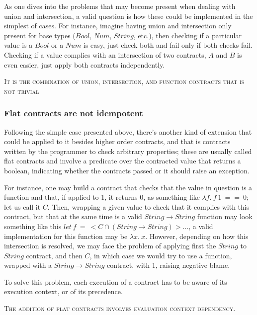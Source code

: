 As one dives into the problems that may become present when dealing with union and intersection,
a valid question is how these could be implemented in the simplest of cases.
For instance, imagine having
union and intersection only present for base types ($Bool$, $Num$, $String$, etc.), then checking
if a particular value is a $Bool$ or a $Num$ is easy, just check both and fail only if both 
checks fail. Checking if a value complies with an intersection of two contracts, $A$ and $B$ is even
easier, just apply both contracts independently.

\textsc{It is the combination of union, intersection, and function contracts that is not trivial}

\subsubsection*{Flat contracts are not idempotent}

Following the simple case presented above, there's another kind of extension that could be
applied to it besides higher order contracts, and that is contracts written by the
programmer to check arbitrary properties; these are usually called flat contracts and
involve a predicate over the contracted value that returns a boolean, indicating whether
the contracts passed or it should raise an exception.

For instance, one may build a contract that checks that the value in question is a
function and that, if applied to 1, it returns 0, as something like
$\lambda f.~f~1~==~0$; let us call it $C$.
Then, wrapping a given value to check that it complies with this contract, but that at
the same time is a valid $String \rightarrow String$ function may look something like this
$let~f~=~<C \cap (String \rightarrow String)> ... $, a valid implementation for this function
may be $\lambda x.~x$.
However, depending on how this intersection is resolved, we may face the problem of applying first
the $String$ to $String$ contract, and then $C$, in which case we would try to use a function,
wrapped with a $String \rightarrow String$ contract, with 1, raising negative blame.

To solve this problem, each execution of a contract has to be aware of its execution context,
or of its precedence.



\textsc{The addition of flat contracts involves evaluation context dependency.}

